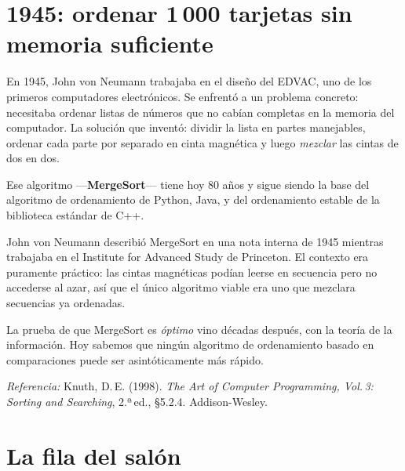 \documentclass[12pt, oneside]{article}
\begin{document}

\tableofcontents
\newpage

\section{1945: ordenar 1\,000 tarjetas sin memoria suficiente}

En 1945, John von Neumann trabajaba en el diseño del EDVAC, uno de los primeros
computadores electrónicos. Se enfrentó a un problema concreto: necesitaba ordenar
listas de números que no cabían completas en la memoria del computador. La solución
que inventó: dividir la lista en partes manejables, ordenar cada parte por separado
en cinta magnética y luego \textit{mezclar} las cintas de dos en dos.

Ese algoritmo —\textbf{MergeSort}— tiene hoy 80 años y sigue siendo
la base del algoritmo de ordenamiento de Python, Java, y del ordenamiento estable
de la biblioteca estándar de C++.

\begin{tecnico}
  John von Neumann describió MergeSort en una nota interna de 1945 mientras
  trabajaba en el Institute for Advanced Study de Princeton. El contexto era
  puramente práctico: las cintas magnéticas podían leerse en secuencia pero no
  accederse al azar, así que el único algoritmo viable era uno que mezclara
  secuencias ya ordenadas.
  \par\smallskip
  La prueba de que Merge\-Sort es \textit{óptimo} vino décadas después,
  con la teoría de la información. Hoy sabemos que ningún algoritmo de
  ordenamiento basado en comparaciones puede ser asintóticamente más rápido.
  \par\smallskip
  \textit{Referencia:} Knuth, D.\,E. (1998). \textit{The Art of Computer
  Programming, Vol.\,3: Sorting and Searching}, 2.ª\,ed., \S5.2.4.
  Addison-Wesley.
\end{tecnico}

\section{La fila del salón}
\end{document}
